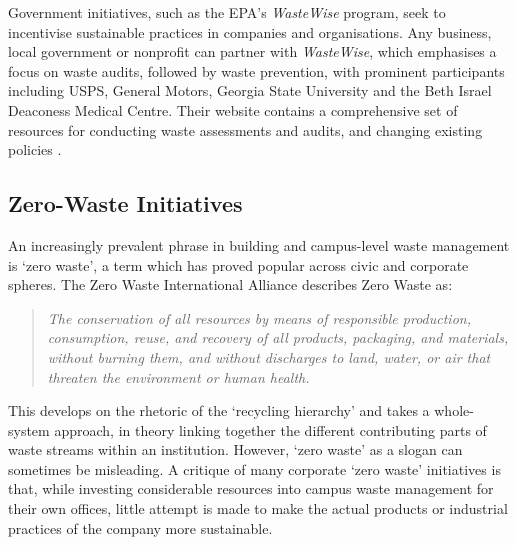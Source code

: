 \documentclass[nofonts,nols,justified,nobib]{tufte-book}
\begin{document}
Government initiatives, such as the EPA's \emph{WasteWise} program, seek to incentivise sustainable practices in companies and organisations. Any business, local government or nonprofit can partner with \emph{WasteWise}, which emphasises a focus on waste audits, followed by waste prevention, with prominent participants including USPS, General Motors, Georgia State University and the Beth Israel Deaconess Medical Centre. Their website contains a comprehensive set of resources for conducting waste assessments and audits, and changing existing policies \cite{us_epa_best_2016}.


\subsection*{Zero-Waste Initiatives}

An increasingly prevalent phrase in building and campus-level waste management is `zero waste', a term which has proved popular across civic and corporate spheres. The Zero Waste International Alliance describes Zero Waste as:

\begin{quote}
\emph{The conservation of all resources by means of responsible production, consumption, reuse, and recovery of all products, packaging, and materials, without burning them, and without discharges to land, water, or air that threaten the environment or human health. 
\cite{zero_waste_international_alliance_zero_2017}}
\end{quote}

This develops on the rhetoric of the `recycling hierarchy' and takes a whole-system approach, in theory linking together the different contributing parts of waste streams within an institution. However, `zero waste' as a slogan can sometimes be misleading. A critique of many corporate `zero waste' initiatives is that, while investing considerable resources into campus waste management for their own offices, little attempt is made to make the actual products or industrial practices of the company more sustainable.
\end{document}
